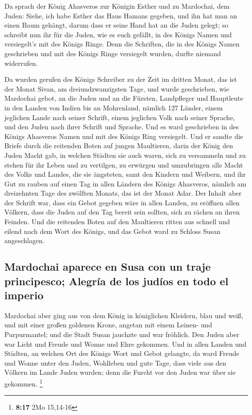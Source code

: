  Da sprach der König Ahasveros zur Königin Esther und zu
Mardochai, dem Juden: Siehe, ich habe Esther das Haus Hamans gegeben,
und ihn hat man an einen Baum gehängt, darum dass er seine Hand hat an
die Juden gelegt;  so schreibt nun ihr für die Juden, wie
es euch gefällt, in des Königs Namen und versiegelt's mit des Königs
Ringe. Denn die Schriften, die in des Königs Namen geschrieben und mit
des Königs Ringe versiegelt wurden, durfte niemand widerrufen.

 Da wurden gerufen des Königs Schreiber zu der Zeit im
dritten Monat, das ist der Monat Sivan, am dreiundzwanzigsten Tage, und
wurde geschrieben, wie Mardochai gebot, an die Juden und an die Fürsten,
Landpfleger und Hauptleute in den Landen von Indien bis an Mohrenland,
nämlich 127 Länder, einem jeglichen Lande nach seiner Schrift, einem
jeglichen Volk nach seiner Sprache, und den Juden nach ihrer Schrift und
Sprache.  Und es ward geschrieben in des Königs Ahasveros
Namen und mit des Königs Ring versiegelt. Und er sandte die Briefe durch
die reitenden Boten auf jungen Maultieren,  darin der
König den Juden Macht gab, in welchen Städten sie auch waren, sich zu
versammeln und zu stehen für ihr Leben und zu vertilgen, zu erwürgen und
umzubringen alle Macht des Volks und Landes, die sie ängsteten, samt den
Kindern und Weibern, und ihr Gut zu rauben  auf einen Tag
in allen Ländern des Königs Ahasveros, nämlich am dreizehnten Tage des
zwölften Monats, das ist der Monat Adar.  Der Inhalt aber
der Schrift war, dass ein Gebot gegeben wäre in allen Landen, zu
eröffnen allen Völkern, dass die Juden auf den Tag bereit sein sollten,
sich zu rächen an ihren Feinden.  Und die reitenden Boten
auf den Maultieren ritten aus schnell und eilend nach dem Wort des
Königs, und das Gebot ward zu Schloss Susan angeschlagen.

\hypertarget{mardochai-aparece-en-susa-con-un-traje-principesco-alegruxeda-de-los-juduxedos-en-todo-el-imperio}{%
\subsection{Mardochai aparece en Susa con un traje principesco; Alegría
de los judíos en todo el
imperio}\label{mardochai-aparece-en-susa-con-un-traje-principesco-alegruxeda-de-los-juduxedos-en-todo-el-imperio}}

 Mardochai aber ging aus von dem König in königlichen
Kleidern, blau und weiß, und mit einer großen goldenen Krone, angetan
mit einem Leinen- und Purpurmantel; und die Stadt Susan jauchzte und war
fröhlich.  Den Juden aber war Licht und Freude und Wonne
und Ehre gekommen.  Und in allen Landen und Städten, an
welchen Ort des Königs Wort und Gebot gelangte, da ward Freude und Wonne
unter den Juden, Wohlleben und gute Tage, dass viele aus den Völkern im
Lande Juden wurden; denn die Furcht vor den Juden war über sie gekommen.
\footnote{\textbf{8:17} 2Mo 15,14-16}

